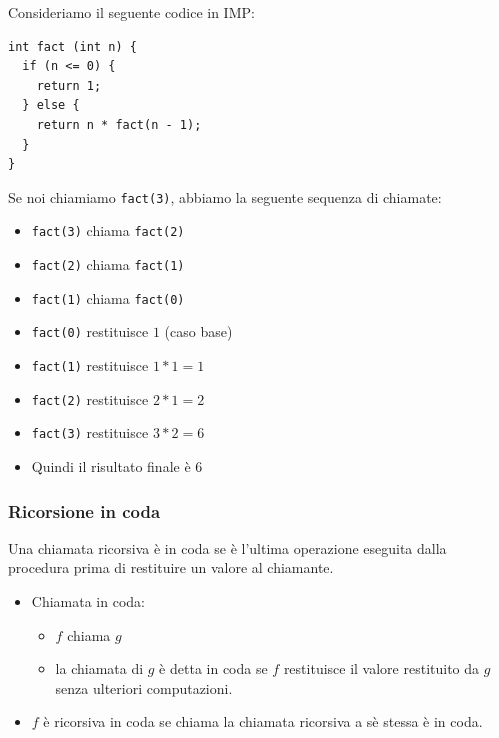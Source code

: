 \documentclass[a4paper]{article}
\begin{document}
\begin{Example}{}{}
Consideriamo il seguente codice in IMP:
\begin{lstlisting}
int fact (int n) {
  if (n <= 0) {
    return 1;
  } else {
    return n * fact(n - 1);
  }
}
\end{lstlisting}
\noindent
Se noi chiamiamo \texttt{fact(3)}, abbiamo la seguente sequenza di chiamate:
\begin{itemize}
  \item \texttt{fact(3)} chiama \texttt{fact(2)}
  \item \texttt{fact(2)} chiama \texttt{fact(1)}
  \item \texttt{fact(1)} chiama \texttt{fact(0)}
  \item \texttt{fact(0)} restituisce $1$ (caso base)
  \item \texttt{fact(1)} restituisce $1 * 1 = 1$
  \item \texttt{fact(2)} restituisce $2 * 1 = 2$
  \item \texttt{fact(3)} restituisce $3 * 2 = 6$
  \item Quindi il risultato finale è $6$
\end{itemize}
\end{Example}

\subsubsection{Ricorsione in coda}

Una chiamata ricorsiva è in coda se è l'ultima operazione eseguita dalla procedura prima di restituire un valore al chiamante.
\begin{itemize}
  \item Chiamata in coda:
  \begin{itemize}
    \item $f$ chiama $g$ 
    \item la chiamata di $g$ è detta in coda se $f$ restituisce il valore restituito da $g$ 
    senza ulteriori computazioni.
  \end{itemize}
  \item $f$ è ricorsiva in coda se chiama la chiamata ricorsiva a sè stessa è in coda.
\end{itemize}
\end{document}

